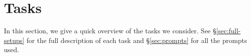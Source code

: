 \section{Tasks} \label{sec:tasks}

In this section, we give a quick overview of the tasks we consider. See \S\ref{sec:full-setups} for the full description of each task and \S\ref{sec:prompts} for all the prompts used.










